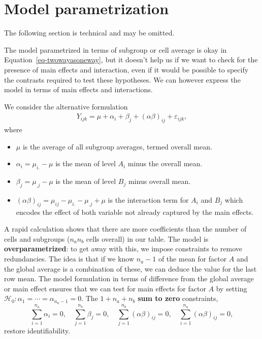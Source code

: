 \documentclass[
  11pt,
  letterpaper,
]{scrbook}
\providecommand{\tightlist}{%
  \setlength{\itemsep}{0pt}\setlength{\parskip}{0pt}}\usepackage{longtable,booktabs,array}
\theoremstyle{definition}
\theoremstyle{definition}
\theoremstyle{remark}
\begin{document}
\section{Model parametrization}\label{model-parametrization}

The following section is technical and may be omitted.

The model parametrized in terms of subgroup or cell average is okay in
Equation~\ref{eq-twowayasoneway}, but it doesn't help us if we want to
check for the presence of main effects and interaction, even if it would
be possible to specify the contrasts required to test these hypotheses.
We can however express the model in terms of main effects and
interactions.

We consider the alternative formulation \begin{align*}
Y_{ijk} = \mu + \alpha_i + \beta_j + (\alpha\beta)_{ij} + \varepsilon_{ijk},
\end{align*} where

\begin{itemize}
\tightlist
\item
  \(\mu\) is the average of all subgroup averages, termed overall mean.
\item
  \(\alpha_i = \mu_{i.} - \mu\) is the mean of level \(A_i\) minus the
  overall mean.
\item
  \(\beta_j  = \mu_{.j} - \mu\) is the mean of level \(B_j\) minus
  overall mean.
\item
  \((\alpha\beta)_{ij} = \mu_{ij} - \mu_{i.} - \mu_{.j} + \mu\) is the
  interaction term for \(A_i\) and \(B_j\) which encodes the effect of
  both variable not already captured by the main effects.
\end{itemize}

A rapid calculation shows that there are more coefficients than the
number of cells and subgroups (\(n_an_b\) cells overall) in our table.
The model is \textbf{overparametrized}: to get away with this, we impose
constraints to remove redundancies. The idea is that if we know
\(n_a-1\) of the mean for factor \(A\) and the global average is a
combination of these, we can deduce the value for the last row mean. The
model formulation in terms of difference from the global average or main
effect ensures that we can test for main effects for factor \(A\) by
setting \(\mathscr{H}_0: \alpha_1 = \cdots = \alpha_{n_a-1}=0\). The
\(1 +  n_a + n_b\) \textbf{sum to zero} constraints,
\[\sum_{i=1}^{n_a} \alpha_i=0, \quad \sum_{j=1}^{n_b} \beta_j=0, \quad  \sum_{j=1}^{n_b} (\alpha\beta)_{ij}=0, \quad \sum_{i=1}^{n_a} (\alpha\beta)_{ij}=0,\]
restore identifiability.
\end{document}
